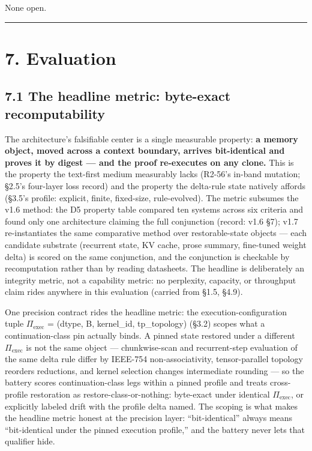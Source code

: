\documentclass[11pt]{article}
\begin{document}
None open.

\begin{center}\rule{0.5\linewidth}{0.5pt}\end{center}

\section{7. Evaluation}\label{evaluation}

\subsection{7.1 The headline metric: byte-exact recomputability}\label{the-headline-metric-byte-exact-recomputability}

The architecture's falsifiable center is a single measurable property: \textbf{a memory object, moved across a context boundary, arrives bit-identical and proves it by digest --- and the proof re-executes on any clone.} This is the property the text-first medium measurably lacks (R2-56's in-band mutation; \S{}2.5's four-layer loss record) and the property the delta-rule state natively affords (\S{}3.5's profile: explicit, finite, fixed-size, rule-evolved). The metric subsumes the v1.6 method: the D5 property table compared ten systems across six criteria and found only one architecture claiming the full conjunction (record: v1.6 \S{}7); v1.7 re-instantiates the same comparative method over restorable-state objects --- each candidate substrate (recurrent state, KV cache, prose summary, fine-tuned weight delta) is scored on the same conjunction, and the conjunction is checkable by recomputation rather than by reading datasheets. The headline is deliberately an integrity metric, not a capability metric: no perplexity, capacity, or throughput claim rides anywhere in this evaluation (carried from \S{}1.5, \S{}4.9).

One precision contract rides the headline metric: the execution-configuration tuple \(\Pi_{\text{exec}}\) = (dtype, B, kernel\_id, tp\_topology) (\S{}3.2) scopes what a continuation-class pin actually binds. A pinned state restored under a different \(\Pi_{\text{exec}}\) is not the same object --- chunkwise-scan and recurrent-step evaluation of the same delta rule differ by IEEE-754 non-associativity, tensor-parallel topology reorders reductions, and kernel selection changes intermediate rounding --- so the battery scores continuation-class legs within a pinned profile and treats cross-profile restoration as restore-class-or-nothing: byte-exact under identical \(\Pi_{\text{exec}}\), or explicitly labeled drift with the profile delta named. The scoping is what makes the headline metric honest at the precision layer: ``bit-identical'' always means ``bit-identical under the pinned execution profile,'' and the battery never lets that qualifier hide.
\end{document}
